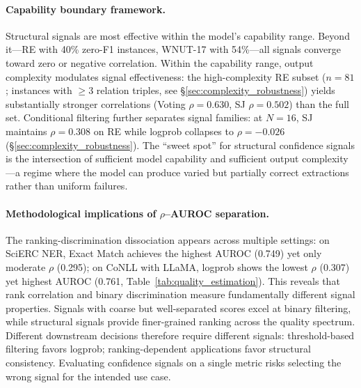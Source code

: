 \paragraph{Capability boundary framework.}
Structural signals are most effective within the model's capability range.
Beyond it---RE with 40\% zero-F1 instances, WNUT-17 with 54\%---all signals converge toward zero or negative correlation.
Within the capability range, output complexity modulates signal effectiveness: the high-complexity RE subset ($n{=}81$; instances with ${\geq}3$ relation triples, see \S\ref{sec:complexity_robustness}) yields substantially stronger correlations (Voting $\rho{=}0.630$, SJ $\rho{=}0.502$) than the full set.
Conditional filtering further separates signal families: at $N{=}16$, SJ maintains $\rho{=}0.308$ on RE while logprob collapses to $\rho{=}{-}0.026$ (\S\ref{sec:complexity_robustness}).
The ``sweet spot'' for structural confidence signals is the intersection of sufficient model capability and sufficient output complexity---a regime where the model can produce varied but partially correct extractions rather than uniform failures.

\paragraph{Methodological implications of $\rho$--AUROC separation.}
The ranking-discrimination dissociation appears across multiple settings: on SciERC NER, Exact Match achieves the highest AUROC (0.749) yet only moderate $\rho$ (0.295); on CoNLL with LLaMA, logprob shows the lowest $\rho$ (0.307) yet highest AUROC (0.761, Table~\ref{tab:quality_estimation}).
This reveals that rank correlation and binary discrimination measure fundamentally different signal properties.
Signals with coarse but well-separated scores excel at binary filtering, while structural signals provide finer-grained ranking across the quality spectrum.
Different downstream decisions therefore require different signals: threshold-based filtering favors logprob; ranking-dependent applications favor structural consistency.
Evaluating confidence signals on a single metric risks selecting the wrong signal for the intended use case.

